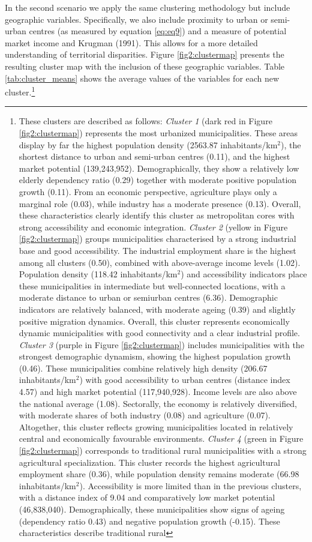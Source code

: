 \documentclass[a4paper,11pt,oneside]{article}
\begin{document}
In the second scenario we apply the same clustering methodology but include geographic variables. Specifically, we also include proximity to urban or semi-urban centres (as measured by equation \eqref{eq:eq9}) and a measure of potential market income \citep{harris1954market} and Krugman (1991). This allows for a more detailed understanding of territorial disparities. Figure \ref{fig2:clustermap} presents the resulting cluster map with the inclusion of these geographic variables. Table \ref{tab:cluster_means} shows the average values of the variables for each new cluster.\footnote{These clusters are described as follows:
\textit{Cluster 1} (dark red in Figure \ref{fig2:clustermap}) represents the most urbanized municipalities. These areas display by far the highest population density (2563.87 inhabitants/km$^{2}$), the shortest distance to urban and semi-urban centres (0.11), and the highest market potential (139,243,952). Demographically, they show a relatively low elderly dependency ratio (0.29) together with moderate positive population growth (0.11). From an economic perspective, agriculture plays only a marginal role (0.03), while industry has a moderate presence (0.13). Overall, these characteristics clearly identify this cluster as metropolitan cores with strong accessibility and economic integration. \textit{Cluster 2} (yellow in Figure \ref{fig2:clustermap}) groups municipalities characterised by a strong industrial base and good accessibility. The industrial employment share is the highest among all clusters (0.50), combined with above-average income levels (1.02). Population density (118.42 inhabitants/km$^{2}$) and accessibility indicators place these municipalities in intermediate but well-connected locations, with a moderate distance to urban or semiurban centres (6.36). Demographic indicators are relatively balanced, with moderate ageing (0.39) and slightly positive migration dynamics. Overall, this cluster represents economically dynamic municipalities with good connectivity and a clear industrial profile. \textit{Cluster 3} (purple in Figure \ref{fig2:clustermap}) includes municipalities with the strongest demographic dynamism, showing the highest population growth (0.46). These municipalities combine relatively high density (206.67 inhabitants/km$^{2}$) with good accessibility to urban centres (distance index 4.57) and high market potential (117,940,928). Income levels are also above the national average (1.08). Sectorally, the economy is relatively diversified, with moderate shares of both industry (0.08) and agriculture (0.07). Altogether, this cluster reflects growing municipalities located in relatively central and economically favourable environments. \textit{Cluster 4} (green in Figure \ref{fig2:clustermap}) corresponds to traditional rural municipalities with a strong agricultural specialization. This cluster records the highest agricultural employment share (0.36), while population density remains moderate (66.98 inhabitants/km$^{2}$). Accessibility is more limited than in the previous clusters, with a distance index of 9.04 and comparatively low market potential (46,838,040). Demographically, these municipalities show signs of ageing (dependency ratio 0.43) and negative population growth (-0.15). These characteristics describe traditional rural }
\end{document}
